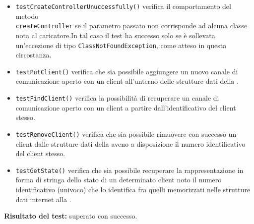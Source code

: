 \begin{itemize}
\begin{itemize}
\item \texttt{testCreateControllerUnuccessfully()} verifica il comportamento del metodo \\ \texttt{createController} se il parametro passato non corrisponde ad alcuna classe nota al caricatore.In tal caso il test ha successo solo se è sollevata un'eccezione di tipo \texttt{ClassNotFoundException}, come atteso in questa circostanza.

\item \texttt{testPutClient()} verifica che sia possibile aggiungere un nuovo canale di comunicazione aperto con un client all'unterno delle strutture dati della .

\item \texttt{testFindClient()} verifica la possibilità di recuperare un canale di comunicazione aperto con un client a partire dall'identificativo del client stesso.

\item \texttt{testRemoveClient()} verifica che sia possibile rimuovere con successo un client dalle strutture dati della  aveno a disposizione il numero identificativo del client stesso.

\item \texttt{testGetState()} verifica che sia possibile recuperare la rappresentazione in forma di stringa dello stato di un determinato client noto il numero identificativo (univoco) che lo identifica fra quelli memorizzati nelle strutture dati internet alla .

 \end{itemize}
\textbf{Risultato del test:} superato con successo.

\end{itemize}


